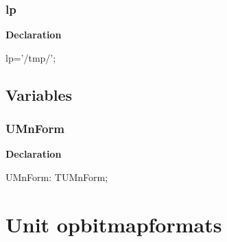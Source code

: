 \documentclass{report}
\newif\ifpdf
\begin{document}
\subsection*{lp}
\fi
\label{mnupdate-lp}
\begin{list}{}{
\setlength{\itemindent}{0cm}
\setlength{\listparindent}{0cm}
\setlength{\leftmargin}{\evensidemargin}
\addtolength{\leftmargin}{\tmplength}
\settowidth{\labelsep}{X}
\addtolength{\leftmargin}{\labelsep}
\setlength{\labelwidth}{\tmplength}
}
\item[\textbf{Declaration}\hfill]
\ifpdf
\begin{flushleft}
\fi
\begin{ttfamily}
lp='/tmp/';\end{ttfamily}

\ifpdf
\end{flushleft}
\fi

\end{list}
\section{Variables}
\ifpdf
\subsection*{\large{\textbf{UMnForm}}\normalsize\hspace{1ex}\hrulefill}
\else
\subsection*{UMnForm}
\fi
\label{mnupdate-UMnForm}
\begin{list}{}{
\setlength{\itemindent}{0cm}
\setlength{\listparindent}{0cm}
\setlength{\leftmargin}{\evensidemargin}
\addtolength{\leftmargin}{\tmplength}
\settowidth{\labelsep}{X}
\addtolength{\leftmargin}{\labelsep}
\setlength{\labelwidth}{\tmplength}
}
\item[\textbf{Declaration}\hfill]
\ifpdf
\begin{flushleft}
\fi
\begin{ttfamily}
UMnForm: TUMnForm;\end{ttfamily}

\ifpdf
\end{flushleft}
\fi

\end{list}
\chapter{Unit opbitmapformats}
\label{opbitmapformats}
\end{document}
